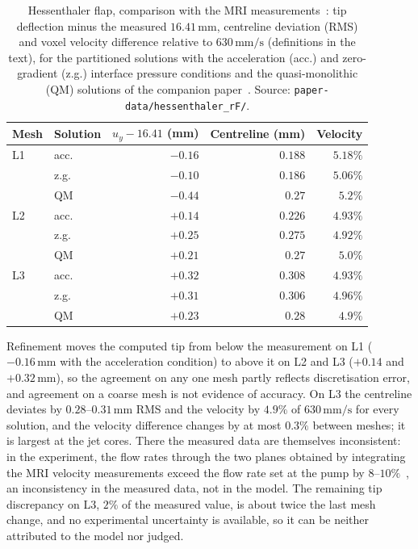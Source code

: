 \begin{table}[htbp]
	\centering
	\small
	\caption{Hessenthaler flap, comparison with the MRI measurements~\citep{Hessenthaler2017a}: tip deflection minus the measured $16.41\,\mathrm{mm}$, centreline deviation (RMS) and voxel velocity difference relative to $630\,\mathrm{mm/s}$ (definitions in the text), for the partitioned solutions with the acceleration (acc.) and zero-gradient (z.g.) interface pressure conditions and the quasi-monolithic (QM) solutions of the companion paper~\citep{CardiffBatistic2026QM}. Source: \texttt{paper-data/hessenthaler\_rF/}.}
	\label{tab:hessenthaler_validation}
	\begin{tabular}{llrrr}
		\toprule
		Mesh & Solution & $u_y - 16.41$ (mm) & Centreline (mm) & Velocity \\
		\midrule
		L1 & acc. & $-0.16$ & $0.188$ & $5.18\%$ \\
		    & z.g. & $-0.10$ & $0.186$ & $5.06\%$ \\
		    & QM   & $-0.44$ & $0.27$  & $5.2\%$ \\
		L2 & acc. & $+0.14$ & $0.226$ & $4.93\%$ \\
		    & z.g. & $+0.25$ & $0.275$ & $4.92\%$ \\
		    & QM   & $+0.21$ & $0.27$  & $5.0\%$ \\
		L3 & acc. & $+0.32$ & $0.308$ & $4.93\%$ \\
		    & z.g. & $+0.31$ & $0.306$ & $4.96\%$ \\
		    & QM   & $+0.23$ & $0.28$  & $4.9\%$ \\
		\bottomrule
	\end{tabular}
\end{table}

Refinement moves the computed tip from below the measurement on L1 ($-0.16\,\mathrm{mm}$ with the acceleration condition) to above it on L2 and L3 ($+0.14$ and $+0.32\,\mathrm{mm}$), so the agreement on any one mesh partly reflects discretisation error, and agreement on a coarse mesh is not evidence of accuracy.
On L3 the centreline deviates by $0.28$--$0.31\,\mathrm{mm}$ RMS and the velocity by $4.9\%$ of $630\,\mathrm{mm/s}$ for every solution, and the velocity difference changes by at most $0.3\%$ between meshes; it is largest at the jet cores. There the measured data are themselves inconsistent: in the experiment, the flow rates through the two planes obtained by integrating the MRI velocity measurements exceed the flow rate set at the pump by $8$--$10\%$~\citep{CardiffBatistic2026QM}, an inconsistency in the measured data, not in the model.
The remaining tip discrepancy on L3, $2\%$ of the measured value, is about twice the last mesh change, and no experimental uncertainty is available, so it can be neither attributed to the model nor judged.

